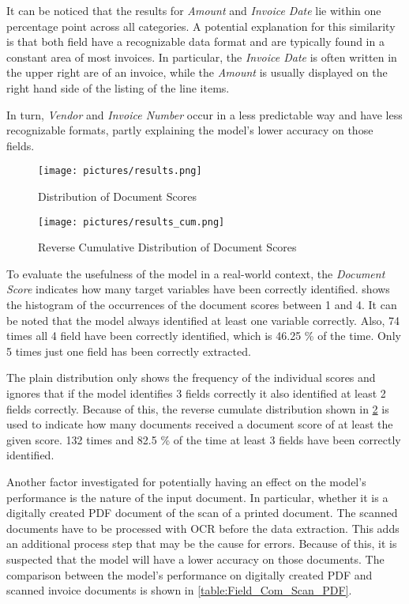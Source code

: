 It can be noticed that the results for \textit{Amount} and \textit{Invoice Date} lie within one percentage point across all categories. A potential explanation for this similarity is that both field have a recognizable data format and are typically found in a constant area of most invoices. In particular, the \textit{Invoice Date} is often written in the upper right are of an invoice, while the \textit{Amount} is usually displayed on the right hand side of the listing of the line items.

In turn, \textit{Vendor} and \textit{Invoice Number} occur in a less predictable way and have less recognizable formats, partly explaining the model's lower accuracy on those fields. 

\begin{figure}[!ht]
    \centering 
    \texttt{[image: pictures/results.png]}
    \caption{Distribution of Document Scores}
    \label{pic:results_1}    %
\end{figure}
\begin{figure}[!ht]
    \centering 
    \texttt{[image: pictures/results\_cum.png]}
    \caption{Reverse Cumulative Distribution of Document Scores}
    \label{pic:results_1_cum}    %
\end{figure}

To evaluate the usefulness of the model in a real-world context, the \textit{Document Score} indicates how many target variables have been correctly identified.  shows the histogram of the occurrences of the document scores between 1 and 4. It can be noted that the model always identified at least one variable correctly. Also, 74 times all 4 field have been correctly identified, which is 46.25 \% of the time. Only 5 times just one field has been correctly extracted.

The plain distribution only shows the frequency of the individual scores and ignores that if the model identifies 3 fields correctly it also identified at least 2 fields correctly. Because of this, the reverse cumulate distribution shown in \cref{pic:results_1_cum} is used to indicate how many documents received a document score of at least the given score. 132 times and 82.5 \% of the time at least 3 fields have been correctly identified.

Another factor investigated for potentially having an effect on the model's performance is the nature of the input document. In particular, whether it is a digitally created PDF document of the scan of a printed document. The scanned documents have to be processed with \ac{OCR} before the data extraction. This adds an additional process step that may be the cause for errors. Because of this, it is suspected that the model will have a lower accuracy on those documents. The comparison between the model's performance on digitally created PDF and scanned invoice documents is shown in \cref{table:Field_Com_Scan_PDF}.

